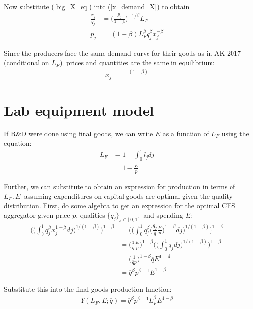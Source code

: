 \documentclass[12pt,english]{article}
\theoremstyle{remark}
\begin{document}
Now substitute (\ref{big_X_eq}) into (\ref{x_demand_X}) to obtain 
\begin{align}
\frac{x_j}{q_j} &= \Big(\frac{p_j}{1-\beta}\Big)^{-1/\beta} L_F  \nonumber \\
p_j &= (1-\beta) L_F^{\beta} q_j^{\beta} x_j^{-\beta}
\end{align}

Since the producers face the same demand curve for their goods as in AK 2017 (conditional on $L_F$), prices and quantities are the same in equilibrium:
\begin{align*}
x_j &= \Big[ \frac{(1-\beta)}{}
\end{align*}












\break
\section{Lab equipment model} If R\&D were done using final goods, we can write $E$ as a function of $L_F$ using the equation:
\begin{align*}
L_F &= 1 - \int_0^1 l_j dj \\
	&= 1- \frac{E}{p}
\end{align*}

Further, we can substitute to obtain an expression for production in terms of $L_F,E$, assuming expenditures on capital goods are optimal given the quality distribution. First, do some algebra to get an expression for the optimal CES aggregator given price $p$, qualities $\{q_j\}_{j \in [0,1]}$ and spending $E$: 
\begin{align*}
\Big(\big(\int_0^1 q_j^{\beta} x_j^{1-\beta} dj \big)^{1/(1-\beta)} \Big)^{1-\beta} &= \Big(\big(\int_0^1 q_j^{\beta} \big(\frac{q_j}{\overline{q}}\frac{E}{p}\big)^{1-\beta} dj\big)^{1/(1-\beta)} \Big)^{1-\beta} \\
&= \big(\frac{1}{\overline{q}}\frac{E}{p}\big)^{1-\beta} \Big(\big(\int_0^1 q_j dj \big)^{1/(1-\beta)} \Big)^{1-\beta} \\
&= \big(\frac{1}{\overline{q}p}\big)^{1-\beta} \overline{q} E^{1-\beta} \\
&= \overline{q}^{\beta} p^{\beta - 1} E^{1-\beta}
\end{align*}

Substitute this into the final goods production function:
\begin{align*}
Y(L_F,E;\overline{q}) = \overline{q}^{\beta} p^{\beta - 1} L_F^{\beta} E^{1-\beta}
\end{align*}
\end{document}
